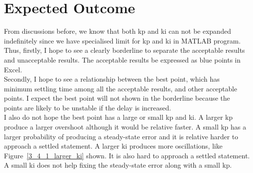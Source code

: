\section{Expected Outcome} %
\label{section4.2}
From discussions before, we know that both kp and ki can not be expanded indefinitely since we have specialised limit for kp and ki in MATLAB program. Thus, firstly, I hope to see a clearly borderline to separate the acceptable results and unacceptable results. The acceptable results be expressed as blue points in Excel. \\

Secondly, I hope to see a relationship between the best point, which has minimum settling time among all the acceptable results, and other acceptable points. I expect the best point will not shown in the borderline because the points are likely to be unstable if the delay is increased. \\

I also do not hope the best point has a large or small kp and ki. A larger kp produce a larger overshoot although it would be relative faster. A small kp has a larger probability of producing a steady-state error and it is relative harder to approach a settled statement. A larger ki produces more oscillations, like Figure~\ref{3_4_1_larger_ki} shown. It is also hard to approach a settled statement. A small ki does not help fixing the steady-state error along with a small kp. \\